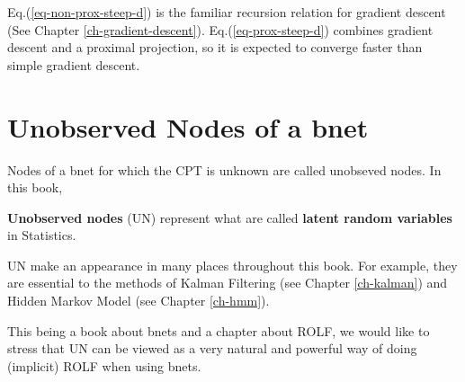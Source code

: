 Eq.(\ref{eq-non-prox-steep-d}) is the familiar
recursion relation for
gradient
descent (See Chapter \ref{ch-gradient-descent}).
Eq.(\ref{eq-prox-steep-d})
combines gradient descent
and a proximal projection,
so it is expected to
converge faster than
simple gradient descent.

\section{Unobserved Nodes of a bnet}

Nodes of a bnet for which the CPT is unknown are called unobseved nodes.
In this book, \hiddenNodes


{\bf Unobserved nodes} (UN) represent what are called
 {\bf latent random variables} in Statistics.

 UN make an appearance in many
 places throughout this book.
 For example, they are essential
 to the methods of
 Kalman Filtering (see Chapter \ref{ch-kalman}) and
 Hidden Markov Model (see Chapter \ref{ch-hmm}).

This being a book about bnets and a chapter about ROLF,
we would like to stress that UN
can be viewed as a very natural and powerful way of
doing (implicit) ROLF when using bnets.
